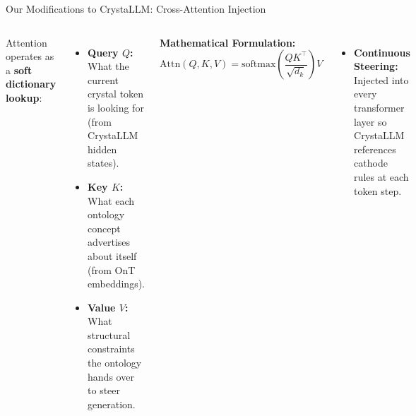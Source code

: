 \documentclass[aspectratio=169, 11pt]{beamer}
\begin{document}
\begin{frame}{Our Modifications to CrystaLLM: Cross-Attention Injection~\cite{antunes2024crystallm}}
\vspace{0.25cm}
\begin{columns}[T]
    \footnotesize
    Attention operates as a \textbf{soft dictionary lookup}:
    \vspace{0.15cm}
    \begin{itemize}\itemsep0.35em
        \item \textbf{Query $Q$:} What the current crystal token is looking for (from CrystaLLM hidden states).
        \item \textbf{Key $K$:} What each ontology concept advertises about itself (from OnT embeddings).
        \item \textbf{Value $V$:} What structural constraints the ontology hands over to steer generation.
    \end{itemize}

    \footnotesize
    \textbf{Mathematical Formulation:}
    $$\mathrm{Attn}(Q,K,V) = \mathrm{softmax}\!\left(\frac{QK^{\top}}{\sqrt{d_k}}\right)V$$
    \vspace{-0.1cm}
    \begin{itemize}\itemsep0.35em
        \item \textbf{Continuous Steering:} Injected into every transformer layer so CrystaLLM references cathode rules at each token step.
    \end{itemize}
\end{columns}
\end{frame}
\end{document}
